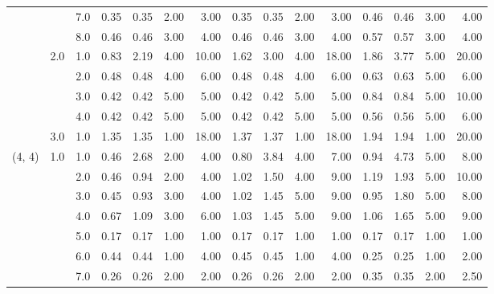 \begin{tabular}{lllrrrrrrrrrrrr}
       &     & 7.0  &       0.35 &      0.35 & 2.00 &   3.00 &       0.35 &      0.35 &  2.00 &   3.00 &       0.46 &      0.46 &  3.00 &   4.00 \\
       &     & 8.0  &       0.46 &      0.46 & 3.00 &   4.00 &       0.46 &      0.46 &  3.00 &   4.00 &       0.57 &      0.57 &  3.00 &   4.00 \\
       & 2.0 & 1.0  &       0.83 &      2.19 & 4.00 &  10.00 &       1.62 &      3.00 &  4.00 &  18.00 &       1.86 &      3.77 &  5.00 &  20.00 \\
       &     & 2.0  &       0.48 &      0.48 & 4.00 &   6.00 &       0.48 &      0.48 &  4.00 &   6.00 &       0.63 &      0.63 &  5.00 &   6.00 \\
       &     & 3.0  &       0.42 &      0.42 & 5.00 &   5.00 &       0.42 &      0.42 &  5.00 &   5.00 &       0.84 &      0.84 &  5.00 &  10.00 \\
       &     & 4.0  &       0.42 &      0.42 & 5.00 &   5.00 &       0.42 &      0.42 &  5.00 &   5.00 &       0.56 &      0.56 &  5.00 &   6.00 \\
       & 3.0 & 1.0  &       1.35 &      1.35 & 1.00 &  18.00 &       1.37 &      1.37 &  1.00 &  18.00 &       1.94 &      1.94 &  1.00 &  20.00 \\
(4, 4) & 1.0 & 1.0  &       0.46 &      2.68 & 2.00 &   4.00 &       0.80 &      3.84 &  4.00 &   7.00 &       0.94 &      4.73 &  5.00 &   8.00 \\
       &     & 2.0  &       0.46 &      0.94 & 2.00 &   4.00 &       1.02 &      1.50 &  4.00 &   9.00 &       1.19 &      1.93 &  5.00 &  10.00 \\
       &     & 3.0  &       0.45 &      0.93 & 3.00 &   4.00 &       1.02 &      1.45 &  5.00 &   9.00 &       0.95 &      1.80 &  5.00 &   8.00 \\
       &     & 4.0  &       0.67 &      1.09 & 3.00 &   6.00 &       1.03 &      1.45 &  5.00 &   9.00 &       1.06 &      1.65 &  5.00 &   9.00 \\
       &     & 5.0  &       0.17 &      0.17 & 1.00 &   1.00 &       0.17 &      0.17 &  1.00 &   1.00 &       0.17 &      0.17 &  1.00 &   1.00 \\
       &     & 6.0  &       0.44 &      0.44 & 1.00 &   4.00 &       0.45 &      0.45 &  1.00 &   4.00 &       0.25 &      0.25 &  1.00 &   2.00 \\
       &     & 7.0  &       0.26 &      0.26 & 2.00 &   2.00 &       0.26 &      0.26 &  2.00 &   2.00 &       0.35 &      0.35 &  2.00 &   2.50 \\

\end{tabular}
